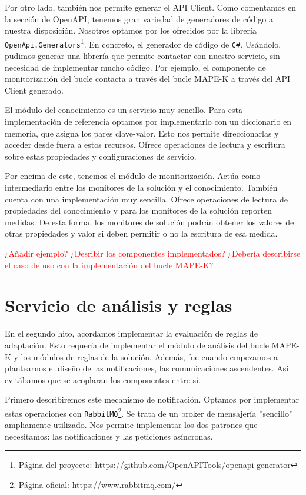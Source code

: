 Por otro lado, también nos permite generar el API Client. Como comentamos en la sección de OpenAPI, tenemos gran variedad de generadores de código a nuestra disposición. Nosotros optamos por los ofrecidos por la librería \texttt{OpenApi.Generators}\footnote{Página del proyecto: \url{https://github.com/OpenAPITools/openapi-generator}}. En concreto, el generador de código de \verb|C#|. Usándolo, pudimos generar una librería que permite contactar con nuestro servicio, sin necesidad de implementar mucho código. Por ejemplo, el componente de monitorización del bucle contacta a través del bucle MAPE-K a través del API Client generado.

El módulo del conocimiento es un servicio muy sencillo. Para esta implementación de referencia optamos por implementarlo con un diccionario en memoria, que asigna los pares clave-valor. Esto nos permite direccionarlas y acceder desde fuera a estos recursos. Ofrece operaciones de lectura y escritura sobre estas propiedades y configuraciones de servicio.

Por encima de este, tenemos el módulo de monitorización. Actúa como intermediario entre los monitores de la solución y el conocimiento. También cuenta con una implementación muy sencilla. Ofrece operaciones de lectura de propiedades del conocimiento y para los monitores de la solución reporten medidas. De esta forma, los monitores de solución podrán obtener los valores de otras propiedades y valor si deben permitir o no la escritura de esa medida.

\textcolor{red}{¿Añadir ejemplo? ¿Desribir los componentes implementados? ¿Debería describirse el caso de uso con la implementación del bucle MAPE-K?}

\section{Servicio de análisis y reglas}

En el segundo hito, acordamos implementar la evaluación de reglas de adaptación. Esto requería de implementar el módulo de análisis del bucle MAPE-K y los módulos de reglas de la solución. Además, fue cuando empezamos a plantearnos el diseño de las notificaciones, las comunicaciones ascendentes. Así evitábamos que se acoplaran los componentes entre sí.

Primero describiremos este mecanismo de notificación. Optamos por implementar estas operaciones con \texttt{RabbitMQ}\footnote{Página oficial: \url{https://www.rabbitmq.com/}}. Se trata de un broker de mensajería ''sencillo'' ampliamente utilizado. Nos permite implementar los dos patrones que necesitamos: las notificaciones y las peticiones asíncronas.


